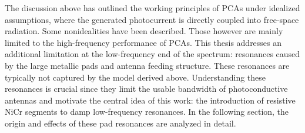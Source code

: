 The discussion above has outlined the working principles of PCAs under idealized
assumptions, where the generated photocurrent is directly coupled into free-space radiation. Some nonidealities have been described. Those however are mainly limited to the high-frequency performance of PCAs. This thesis addresses an additional limitation at the low-frequency end of the spectrum: resonances caused by the large metallic pads and antenna feeding structure. These resonances are typically not captured by the model derived above. Understanding these resonances is crucial since they limit the usable bandwidth of photoconductive antennas and motivate the central idea of this work: the introduction of resistive NiCr segments to damp low-frequency resonances. In the following section, the
origin and effects of these pad resonances are analyzed in detail.
